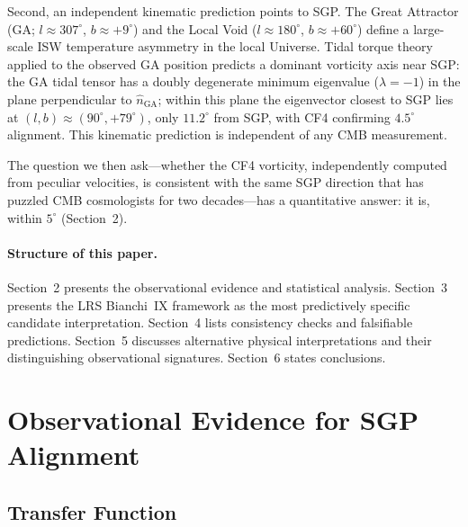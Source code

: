 \documentclass[12pt]{article}
\begin{document}
Second, an independent kinematic prediction points to SGP.
The Great Attractor (GA; $l\approx307^\circ$, $b\approx+9^\circ$) and the Local
Void ($l\approx180^\circ$, $b\approx+60^\circ$) define a large-scale ISW
temperature asymmetry in the local Universe.
Tidal torque theory \citep{Peebles1969, White1984} applied to the observed GA
position predicts a dominant vorticity axis near SGP: the GA tidal tensor
has a doubly degenerate minimum eigenvalue ($\lambda=-1$) in the plane
perpendicular to $\hat{n}_\mathrm{GA}$; within this plane the eigenvector
closest to SGP lies at $(l,b)\approx(90^\circ,+79^\circ)$,
only $11.2^\circ$ from SGP, with CF4 confirming $4.5^\circ$ alignment.
This kinematic prediction is independent of any CMB measurement.

The question we then ask---whether the CF4 vorticity, independently computed
from peculiar velocities, is consistent with the same SGP direction that has
puzzled CMB cosmologists for two decades---has a quantitative answer:
it is, within $5^\circ$ (Section~2).

\paragraph{Structure of this paper.}
Section~2 presents the observational evidence and statistical analysis.
Section~3 presents the LRS Bianchi~IX framework as the most predictively
specific candidate interpretation.
Section~4 lists consistency checks and falsifiable predictions.
Section~5 discusses alternative physical interpretations and their
distinguishing observational signatures.
Section~6 states conclusions.

\section{Observational Evidence for SGP Alignment}

\subsection{Transfer Function}
\end{document}
